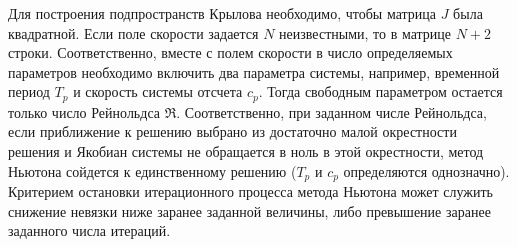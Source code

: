 Для построения подпространств Крылова необходимо, чтобы матрица $J$ была квадратной. Если поле скорости задается $N$ неизвестными, то в матрице $N+2$ строки. Соответственно, вместе с полем скорости в число определяемых параметров необходимо включить два параметра системы, например, временной период $T_p$ и скорость системы отсчета $c_p$. Тогда свободным параметром остается только число Рейнольдса $\Re$. Соответственно, при заданном числе Рейнольдса, если приближение к решению выбрано из достаточно малой окрестности решения и Якобиан системы не обращается в ноль в этой окрестности, метод Ньютона сойдется к единственному решению ($T_p$ и $c_p$ определяются однозначно). Критерием остановки итерационного процесса метода Ньютона может служить снижение невязки ниже заранее заданной величины, либо превышение заранее заданного числа итераций. 




